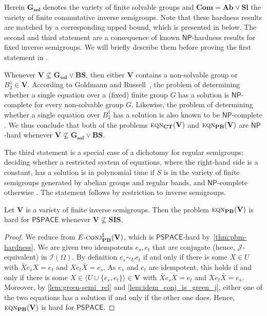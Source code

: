 \documentclass[anonymous,letter,UKenglish,cleveref,autoref,thm-restate]{lipics-v2021}
\newcommand{\gen}[1]{\langle #1 \rangle}
\newcommand{\NP}{\ensuremath{\mathsf{NP}}\xspace}
\newcommand{\PSPACE}{\ensuremath{\mathsf{PSPACE}}\xspace}
\newcommand{\vV}{\ensuremath{\mathbf{V}}}
\newcommand{\vAb}{\ensuremath{\mathbf{Ab}}}
\newcommand{\vGSol}{\ensuremath{\mathbf{G_{\text{sol}}}}}
\newcommand{\vSl}{\ensuremath{\mathbf{Sl}}}
\newcommand{\vSI}{\ensuremath{\mathbf{SIS}}}
\newcommand{\vCom}{\ensuremath{\mathbf{Com}}}
\newcommand{\vBS}{\ensuremath{\mathbf{BS}}}  \newcommand{\vBM}{\ensuremath{\mathbf{BM}}}
\newcommand{\ISym}{\cI}
\newcommand*{\gJ}[1][]{\mathrel{\mathcal{J}_{#1}}}
\newcommand{\cI}{\mathcal{I}}
\theoremstyle{plain}
\theoremstyle{plain}
\newcommand{\dConjS}[2][]{\textup{\textsc{conj${}^{\sharp}_{\mathbf{#1}}\expandafter\ifx\expandafter\relax\detokenize{#2}\relax\else(#2)\fi$}}}
\newcommand{\dEqn}[2][]{\textup{\textsc{eqn${}_{\mathbf{#1}}\expandafter\ifx\expandafter\relax\detokenize{#2}\relax\else(#2)\fi$}}}
\newcommand{\dEConjS}[2][]{\ensuremath{E}\textnormal{-}\dConjS[#1]{#2}}
\begin{document}
Herein $\vGSol$ denotes the variety of finite solvable groups and $\vCom = \vAb \vee \vSl$ the variety of finite commutative inverse semigroups.
Note that these hardness results are matched by a corresponding upped bound, which is presented in  below.
The second and third statement are a consequence of known $\NP$-hardness results for fixed inverse semigroups.
We will briefly describe them before proving the first statement in .

Whenever $\vV \not\subseteq \vGSol \vee \vBS$, then either $\vV$ contains a non-solvable group or $B^1_2 \in \vV$.
According to Goldmann and Russell~\cite{GoldmannR02}, the problem of determining whether a single equation over a (fixed) finite group $G$ has a solution is $\NP$-complete for every non-solvable group $G$.
Likewise, the problem of determining whether a single equation over $B^1_2$ has a solution is also known to be $\NP$-complete \cite[Theorem 6]{BarringtonMMTT00}.
We thus conclude that both of the problems $\dEqn[CT]{\vV}$ and $\dEqn[PB]{\vV}$ are $\NP$-hard whenever $\vV \not\subseteq \vGSol \vee \vBS$.

The third statement is a special case of a dichotomy for regular semigroups: deciding whether a restricted system of equations, where the right-hand side is a constant, has a solution is in polynomial time if $S$ is in the variety of finite semigroups generated by abelian groups and regular bands, and $\NP$-complete otherwise \cite{KlimaTT07}.
The statement follows by restriction to inverse semigroups.

\begin{lemma}\label{lem:eqn-hardness}
  Let $\vV$ is a variety of finite inverse semigroups.
  Then the problem $\dEqn[PB]{\vV}$ is hard for $\PSPACE$ whenever $\vV \not\subseteq \vSI$.
\end{lemma}

\begin{proof}
  We reduce from $\dEConjS[PB]{\vV}$, which is $\PSPACE$-hard by~\cref{thm:pbm-hardness}.
  We are given two idempotents $e_s, e_t$ that are conjugate (hence, $\gJ$-equivalent) in $\ISym(\Omega)$.
  By definition $e_s \sim_U e_t$ if and only if there is some $X \in U$ with $\bar X e_s X = e_t$ and $X e_t \bar X = e_s$.
  As $e_s$ and $e_t$ are idempotent, this holds if and only if there is some $X\in  \gen{U \cup \{e_s,e_t\}} \in \vV$ with $\bar X e_s X = e_t$ and $X e_t \bar X = e_s$.
  Moreover, by \cref{lem:green-semi_rel} and \cref{lem:idem_conj_is_green_j}, either one of the two equations has a solution if and only if the other one does.
	Hence, $\dEqn[PB]{\vV}$ is hard for $\PSPACE$.
\end{proof} 
\end{document}
